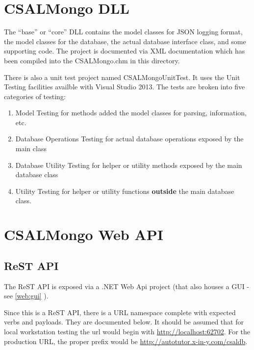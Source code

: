 \documentclass[letterpaper,10pt]{article}
\newcommand{\fullxref}[1]{ \ref{#1} \nameref{#1} }
\begin{document}

\section{CSALMongo DLL}

The ``base'' or ``core'' DLL contains the model classes for JSON logging
format, the model classes for the database, the actual database interface
class, and some supporting code.  The project is documented via XML documentation
which has been compiled into the CSALMongo.chm in this directory.

There is also a unit test project named CSALMongoUnitTest. It uses the Unit
Testing facilities availble with Visual Studio 2013. The tests are broken into
five categories of testing:

\begin{enumerate}
    \item Model Testing for methods added the model classes for
          parsing, information, etc.
    
    \item Database Operations Testing for actual database operations exposed
          by the main class
    
    \item Database Utility Testing for helper or utility methods exposed by
          the main database class
    
    \item Utility Testing for helper or utility functions \textbf{outside} the 
          main database class.
\end{enumerate}




\section{CSALMongo Web API}
\label{sec:webapi}

\subsection{ReST API}

The ReST API is exposed via a .NET Web Api project (that also houses a GUI - 
see \fullxref{web:gui}).

Since this is a ReST API, there is a URL namespace complete with expected verbs
and payloads.  They are documented below.  It should be assumed that for local
workstation testing the url would begin with \url{http://localhost:62702}.  For
the production URL, the proper prefix would be \url{http://autotutor.x-in-y.com/csaldb}.
\end{document}
